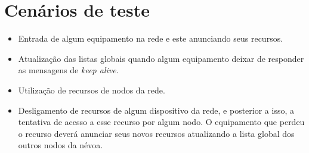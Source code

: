 \section{Cenários de teste}

\begin{itemize}
    \item Entrada de algum equipamento na rede e este anunciando seus recursos. 
    \item Atualização das listas globais quando algum equipamento deixar de responder as mensagens de \textit{keep alive}.
    \item Utilização de recursos de nodos da rede.
    \item Desligamento de recursos de algum dispositivo da rede, e posterior a isso, a tentativa de acesso a esse recurso por algum nodo.
    O equipamento que perdeu o recurso deverá anunciar seus novos recursos atualizando a lista global dos outros nodos da névoa.
\end{itemize}













